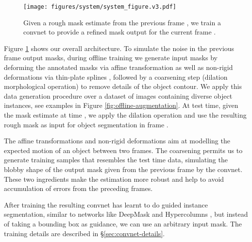 \documentclass[10pt,twocolumn,letterpaper]{article}
\begin{document}
\begin{figure}
\begin{centering}
\texttt{[image: figures/system/system\_figure.v3.pdf]}
\par\end{centering}
\caption{\label{fig:system-diagram}Given a rough mask estimate from the previous frame 
, we train a convnet to provide a refined mask output for the current frame .}
\vspace{-1em}
\end{figure}


Figure \ref{fig:system-diagram} shows our overall architecture.
To simulate the noise in the previous frame output masks, during offline training we generate input masks by deforming the annotated masks via affine transformation as well as non-rigid deformations via thin-plate splines \cite{Bookstein1989Pami},
followed by a coarsening step (dilation morphological operation) to remove details of the object contour.
We apply this data generation procedure over a dataset of  images containing diverse object instances,
see examples in Figure \ref{fig:offline-augmentation}. At test time, given the mask estimate at time , we apply the dilation operation and use the resulting rough mask as input for object
segmentation in frame .


The affine transformations and non-rigid deformations aim at modelling the expected motion of an object between two frames. The coarsening permits us to generate training samples that resembles the test time data, simulating
the blobby shape of the output mask given from the previous frame by the convnet.
These two ingredients make the estimation more robust and help to avoid accumulation of errors from the preceding frames.

After training the resulting convnet has learnt to do guided instance segmentation, similar to networks like DeepMask \cite{Pinheiro2015Nips} and Hypercolumns \cite{Hariharan2015Cvpr}, but instead of taking a bounding box as guidance,
we can use an arbitrary input mask.
The training details are described in \S\ref{sec:convnet-details}.
\end{document}
